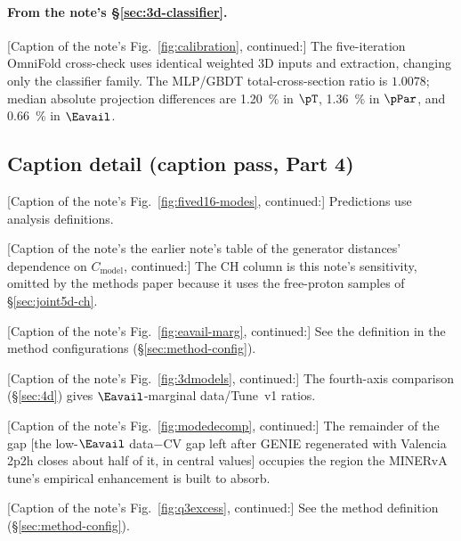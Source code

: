 \paragraph{From the note's \S\ref{sec:3d-classifier}.}
[Caption of the note's Fig.~\ref{fig:calibration}, continued:] The five-iteration OmniFold cross-check uses identical weighted 3D inputs and extraction, changing only the classifier family. The MLP/GBDT total-cross-section ratio is $1.0078$; median absolute projection differences are \SI{1.20}{\percent} in $\pT$, \SI{1.36}{\percent} in $\pPar$, and \SI{0.66}{\percent} in $\Eavail$.

\subsection{Caption detail (caption pass, Part 4)}

[Caption of the note's Fig.~\ref{fig:fived16-modes}, continued:] Predictions use analysis definitions.

[Caption of the note's the earlier note's table of the generator distances' dependence on $C_{\mathrm{model}}$, continued:] The CH column is this note's sensitivity, omitted by the methods paper because it uses the free-proton samples of \S\ref{sec:joint5d-ch}.

[Caption of the note's Fig.~\ref{fig:eavail-marg}, continued:] See the \estPurity{} definition in the method configurations (\S\ref{sec:method-config}).

[Caption of the note's Fig.~\ref{fig:3dmodels}, continued:] The fourth-axis comparison (\S\ref{sec:4d}) gives $\Eavail$-marginal data/Tune~v1 ratios.

[Caption of the note's Fig.~\ref{fig:modedecomp}, continued:] The remainder of the gap [the low-$\Eavail$ data$-$CV gap left after GENIE regenerated with Valencia 2p2h closes about half of it, in central values] occupies the region the MINERvA tune's empirical enhancement is built to absorb.

[Caption of the note's Fig.~\ref{fig:q3excess}, continued:] See the \estPurity{} method definition (\S\ref{sec:method-config}).

